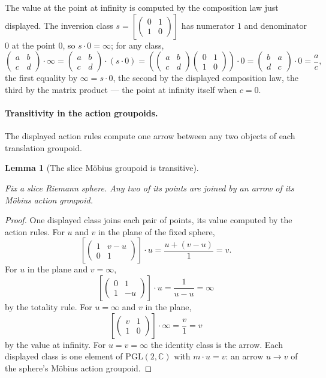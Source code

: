 \documentclass[11pt]{article}
\newcommand{\CC}{\mathbb{C}}
\providecommand{\uses}[1]{}
\theoremstyle{plain}
\newtheorem{lemma}[theorem]{Lemma}
\theoremstyle{definition}
\theoremstyle{remark}
\begin{document}
The value at the point at infinity is computed by the composition law just
displayed. The inversion class
$s=\left[\begin{pmatrix}0&1\\[2pt]1&0\end{pmatrix}\right]$
has numerator $1$ and denominator $0$ at the point $0$, so $s\cdot 0=\infty$;
for any class,
\[
\begin{pmatrix}a&b\\[2pt]c&d\end{pmatrix}\cdot\infty
=\begin{pmatrix}a&b\\[2pt]c&d\end{pmatrix}\cdot(s\cdot 0)
=\left(\begin{pmatrix}a&b\\[2pt]c&d\end{pmatrix}
 \begin{pmatrix}0&1\\[2pt]1&0\end{pmatrix}\right)\cdot 0
=\begin{pmatrix}b&a\\[2pt]d&c\end{pmatrix}\cdot 0
=\frac{a}{c},
\]
the first equality by $\infty=s\cdot 0$, the second by the displayed
composition law, the third by the matrix product --- the point at infinity
itself when $c=0$.

\paragraph{Transitivity in the action groupoids.}
The displayed action rules compute one arrow between any two objects of
each translation groupoid.

\begin{lemma}[The slice M\"obius groupoid is transitive]\label{lem:mobius-transitive}
\uses{def:two-worlds}
Fix a slice Riemann sphere.  Any two of its points are joined by an arrow of
its M\"obius action groupoid.
\end{lemma}

\begin{proof}
One displayed class joins each pair of points, its value computed by the
action rules. For $u$ and $v$ in the plane of the fixed sphere,
\[
\left[\begin{pmatrix}1&v-u\\[2pt]0&1\end{pmatrix}\right]\cdot u
=\frac{u+(v-u)}{1}=v.
\]
For $u$ in the plane and $v=\infty$,
\[
\left[\begin{pmatrix}0&1\\[2pt]1&-u\end{pmatrix}\right]\cdot u
=\frac{1}{u-u}=\infty
\]
by the totality rule. For $u=\infty$ and $v$ in the plane,
\[
\left[\begin{pmatrix}v&1\\[2pt]1&0\end{pmatrix}\right]\cdot\infty
=\frac{v}{1}=v
\]
by the value at infinity. For $u=v=\infty$ the identity class is the
arrow. Each displayed class is one element of $\mathrm{PGL}(2,\CC)$ with
$m\cdot u=v$: an arrow $u\to v$ of the sphere's M\"obius action groupoid.
\end{proof}
\end{document}
